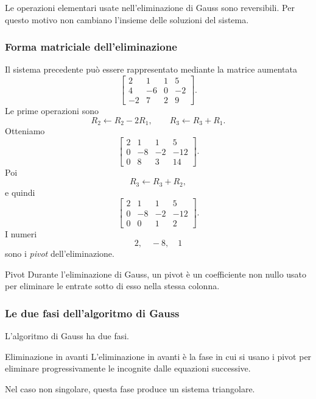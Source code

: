 \documentclass[a4paper]{article}
\begin{document}
\begin{snippetremark}{}
    Le operazioni elementari usate nell'eliminazione di Gauss sono reversibili. Per questo motivo non cambiano l'insieme delle soluzioni del sistema.
\end{snippetremark}

\subsubsection{Forma matriciale dell'eliminazione}

Il sistema precedente può essere rappresentato mediante la matrice aumentata
\[
    \left[
        \begin{array}{ccc|c}
            2 & 1 & 1 & 5\\
            4 & -6 & 0 & -2\\
            -2 & 7 & 2 & 9
        \end{array}
    \right].
\]
Le prime operazioni sono
\[
    R_2 \leftarrow R_2-2R_1,
    \qquad
    R_3 \leftarrow R_3+R_1.
\]
Otteniamo
\[
    \left[
        \begin{array}{ccc|c}
            2 & 1 & 1 & 5\\
            0 & -8 & -2 & -12\\
            0 & 8 & 3 & 14
        \end{array}
    \right].
\]
Poi
\[
    R_3 \leftarrow R_3+R_2,
\]
e quindi
\[
    \left[
        \begin{array}{ccc|c}
            2 & 1 & 1 & 5\\
            0 & -8 & -2 & -12\\
            0 & 0 & 1 & 2
        \end{array}
    \right].
\]
I numeri
\[
    2,\quad -8,\quad 1
\]
sono i \emph{pivot} dell'eliminazione.

\begin{snippetdefinition}{Pivot}
    Durante l'eliminazione di Gauss, un pivot è un coefficiente non nullo usato per eliminare le entrate sotto di esso nella stessa colonna.
\end{snippetdefinition}

\subsubsection{Le due fasi dell'algoritmo di Gauss}

L'algoritmo di Gauss ha due fasi.

\begin{snippetdefinition}{Eliminazione in avanti}
    L'eliminazione in avanti è la fase in cui si usano i pivot per eliminare progressivamente le incognite dalle equazioni successive.

    Nel caso non singolare, questa fase produce un sistema triangolare.
\end{snippetdefinition}
\end{document}
